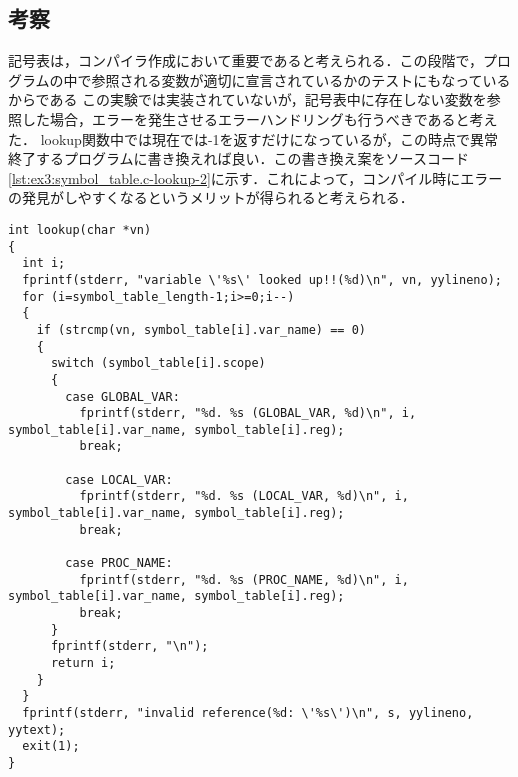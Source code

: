\documentclass[uplatex]{jsarticle}
\begin{document}
\subsection{考察}
記号表は，コンパイラ作成において重要であると考えられる．この段階で，プログラムの中で参照される変数が適切に宣言されているかのテストにもなっているからである
この実験では実装されていないが，記号表中に存在しない変数を参照した場合，エラーを発生させるエラーハンドリングも行うべきであると考えた．
lookup関数中では現在では-1を返すだけになっているが，この時点で異常終了するプログラムに書き換えれば良い．この書き換え案をソースコード\ref{lst:ex3:symbol_table.c-lookup-2}に示す．これによって，コンパイル時にエラーの発見がしやすくなるというメリットが得られると考えられる．
\begin{lstlisting}[caption=lookup関数,label=lst:ex3:symbol_table.c-lookup-2]
int lookup(char *vn)
{
  int i;
  fprintf(stderr, "variable \'%s\' looked up!!(%d)\n", vn, yylineno);
  for (i=symbol_table_length-1;i>=0;i--)
  {
    if (strcmp(vn, symbol_table[i].var_name) == 0)
    {
      switch (symbol_table[i].scope)
      {
        case GLOBAL_VAR:
          fprintf(stderr, "%d. %s (GLOBAL_VAR, %d)\n", i, symbol_table[i].var_name, symbol_table[i].reg);
          break;

        case LOCAL_VAR:
          fprintf(stderr, "%d. %s (LOCAL_VAR, %d)\n", i, symbol_table[i].var_name, symbol_table[i].reg);
          break;

        case PROC_NAME:
          fprintf(stderr, "%d. %s (PROC_NAME, %d)\n", i, symbol_table[i].var_name, symbol_table[i].reg);
          break;
      }
      fprintf(stderr, "\n");
      return i;
    }
  }
  fprintf(stderr, "invalid reference(%d: \'%s\')\n", s, yylineno, yytext);
  exit(1);
}
\end{lstlisting}
\end{document}
